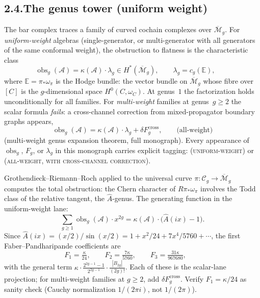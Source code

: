 \documentclass[11pt,reqno]{amsart}
\theoremstyle{definition}
\theoremstyle{remark}
\providecommand{\cA}{\mathcal{A}}
\numberwithin{equation}{section}
\begin{document}
\subsection*{2.4.\enspace The genus tower (uniform weight)}

The bar complex traces a family of curved cochain complexes over
$\overline{\mathcal M}_g$. For \emph{uniform-weight} algebras
(single-generator, or multi-generator with all generators of the same
conformal weight), the obstruction to flatness is the characteristic
class
\begin{equation}\label{eq:obs-uniform}
\operatorname{obs}_g(\cA)=\kappa(\cA)\cdot\lambda_g\in H^*(\overline{\mathcal M}_g),\qquad\lambda_g=c_g(\mathbb E),
\qquad \end{equation}
where $\mathbb E=\pi_*\omega_\pi$ is the Hodge bundle: the vector
bundle on $\overline{\mathcal M}_g$ whose fibre over $[C]$ is the
$g$-dimensional space $H^0(C,\omega_C)$. At genus~$1$ the
factorization holds unconditionally for all families. For
\emph{multi-weight} families at genus~$g\ge 2$ the scalar formula
\emph{fails}: a cross-channel correction from mixed-propagator
boundary graphs appears,
\begin{equation}\label{eq:obs-multiweight}
\operatorname{obs}_g(\cA)=\kappa(\cA)\cdot\lambda_g+\delta F_g^{\mathrm{cross}},\qquad\text{(all-weight)}
\end{equation}
(multi-weight genus expansion theorem, full monograph). Every
appearance of $\operatorname{obs}_g$, $F_g$, or $\lambda_g$ in this
monograph carries explicit tagging: \textsc{(uniform-weight)} or
\textsc{(all-weight, with cross-channel correction)}.

Grothendieck--Riemann--Roch applied to the universal curve
$\pi\colon\mathcal C_g\to\overline{\mathcal M}_g$ computes the total
obstruction: the Chern character of $R\pi_*\omega_\pi$ involves the
Todd class of the relative tangent, the $\hat A$-genus. The
generating function in the uniform-weight lane:
\[
\sum_{g\ge 1}\operatorname{obs}_g(\cA)\cdot x^{2g}=\kappa(\cA)\cdot\bigl(\hat A(ix)-1\bigr).
\]
Since $\hat A(ix)=(x/2)/\sin(x/2)=1+x^2/24+7x^4/5760+\cdots$, the first
Faber--Pandharipande coefficients are
\[
F_1=\tfrac{\kappa}{24},\qquad F_2=\tfrac{7\kappa}{5760},\qquad F_3=\tfrac{31\kappa}{967680},
\qquad \]
with the general term
$\kappa\cdot\tfrac{2^{2g-1}-1}{2^{2g-1}}\cdot\tfrac{|B_{2g}|}{(2g)!}$.
Each of these is the scalar-lane projection; for multi-weight
families at $g\ge 2$, add $\delta F_g^{\mathrm{cross}}$. Verify
$F_1=\kappa/24$ as sanity check (Cauchy normalization
$1/(2\pi i)$, not $1/(2\pi)$).
\end{document}
